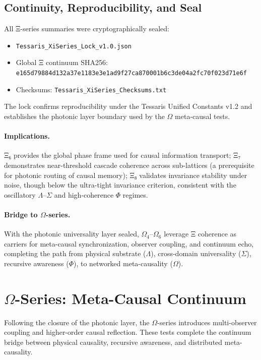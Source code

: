 \documentclass[12pt,a4paper]{article}
\begin{document}
\subsection{Continuity, Reproducibility, and Seal}
All Ξ-series summaries were cryptographically sealed:
\begin{itemize}
  \item \texttt{Tessaris\_XiSeries\_Lock\_v1.0.json}
  \item Global Ξ continuum SHA256: \texttt{e165d79884d132a37e1183e3e1ad9f27ca870001b6c3de04a2fc70f023d71e6f}
  \item Checksums: \texttt{Tessaris\_XiSeries\_Checksums.txt}
\end{itemize}
The lock confirms reproducibility under the Tessaris Unified Constants v1.2 and establishes the photonic layer boundary used by the $\Omega$ meta-causal tests.

\paragraph{Implications.}
Ξ₆ provides the global phase frame used for causal information transport; Ξ₇ demonstrates near-threshold cascade coherence across sub-lattices (a prerequisite for photonic routing of causal memory); Ξ₈ validates invariance stability under noise, though below the ultra-tight invariance criterion, consistent with the oscillatory $\Lambda$–$\Sigma$ and high-coherence $\Phi$ regimes.

\paragraph{Bridge to $\Omega$-series.}
With the photonic universality layer sealed, $\Omega_4$–$\Omega_6$ leverage Ξ coherence as carriers for meta-causal synchronization, observer coupling, and continuum echo, completing the path from physical substrate ($\Lambda$), cross-domain universality ($\Sigma$), recursive awareness ($\Phi$), to networked meta-causality ($\Omega$).

\section{$\Omega$-Series: Meta-Causal Continuum}
Following the closure of the photonic layer, the $\Omega$-series introduces multi-observer coupling and higher-order causal reflection. These tests complete the continuum bridge between physical causality, recursive awareness, and distributed meta-causality.
\end{document}
